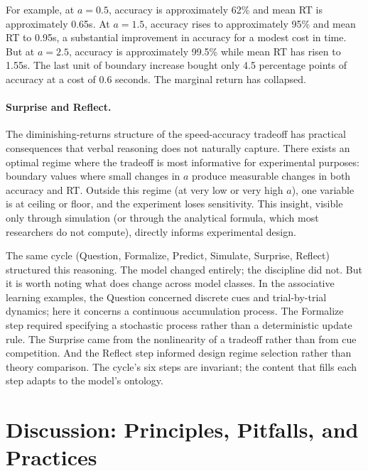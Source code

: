 \documentclass[fleqn,10pt]{wlscirep}
\begin{document}
\begin{linenumbers}
For example, at $a = 0.5$, accuracy is approximately 62\% and mean RT is approximately 0.65s. At $a = 1.5$, accuracy rises to approximately 95\% and mean RT to 0.95s, a substantial improvement in accuracy for a modest cost in time. But at $a = 2.5$, accuracy is approximately 99.5\% while mean RT has risen to 1.55s. The last unit of boundary increase bought only 4.5 percentage points of accuracy at a cost of 0.6 seconds. The marginal return has collapsed.

\paragraph{Surprise and Reflect.} The diminishing-returns structure of the speed-accuracy tradeoff has practical consequences that verbal reasoning does not naturally capture. There exists an optimal regime where the tradeoff is most informative for experimental purposes: boundary values where small changes in $a$ produce measurable changes in both accuracy and RT. Outside this regime (at very low or very high $a$), one variable is at ceiling or floor, and the experiment loses sensitivity. This insight, visible only through simulation (or through the analytical formula, which most researchers do not compute), directly informs experimental design.

The same cycle (Question, Formalize, Predict, Simulate, Surprise, Reflect) structured this reasoning. The model changed entirely; the discipline did not. But it is worth noting what does change across model classes. In the associative learning examples, the Question concerned discrete cues and trial-by-trial dynamics; here it concerns a continuous accumulation process. The Formalize step required specifying a stochastic process rather than a deterministic update rule. The Surprise came from the nonlinearity of a tradeoff rather than from cue competition. And the Reflect step informed design regime selection rather than theory comparison. The cycle's six steps are invariant; the content that fills each step adapts to the model's ontology.

\section{Discussion: Principles, Pitfalls, and Practices}


\end{linenumbers}
\end{document}
